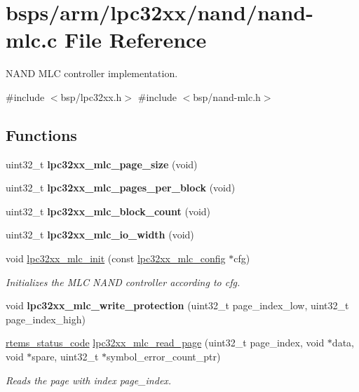 \hypertarget{nand-mlc_8c}{}\section{bsps/arm/lpc32xx/nand/nand-\/mlc.c File Reference}
\label{nand-mlc_8c}


N\+A\+ND M\+LC controller implementation.  


{\ttfamily \#include $<$bsp/lpc32xx.\+h$>$}\newline
{\ttfamily \#include $<$bsp/nand-\/mlc.\+h$>$}\newline
\subsection*{Functions}
\begin{DoxyCompactItemize}
\item 
uint32\+\_\+t {\bfseries lpc32xx\+\_\+mlc\+\_\+page\+\_\+size} (void)
\item 
uint32\+\_\+t {\bfseries lpc32xx\+\_\+mlc\+\_\+pages\+\_\+per\+\_\+block} (void)
\item 
uint32\+\_\+t {\bfseries lpc32xx\+\_\+mlc\+\_\+block\+\_\+count} (void)
\item 
uint32\+\_\+t {\bfseries lpc32xx\+\_\+mlc\+\_\+io\+\_\+width} (void)
\item 
void \mbox{\hyperlink{group__lpc32xx__nand__mlc_ga223b19df7910441502b54c1561f29dcb}{lpc32xx\+\_\+mlc\+\_\+init}} (const \mbox{\hyperlink{structlpc32xx__mlc__config}{lpc32xx\+\_\+mlc\+\_\+config}} $\ast$cfg)
\begin{DoxyCompactList}\small\item\em Initializes the M\+LC N\+A\+ND controller according to {\itshape cfg}. \end{DoxyCompactList}\item 
void {\bfseries lpc32xx\+\_\+mlc\+\_\+write\+\_\+protection} (uint32\+\_\+t page\+\_\+index\+\_\+low, uint32\+\_\+t page\+\_\+index\+\_\+high)
\item 
\mbox{\hyperlink{group__ClassicStatus_ga545d41846817eaba6143d52ee4d9e9fe}{rtems\+\_\+status\+\_\+code}} \mbox{\hyperlink{group__lpc32xx__nand__mlc_gad998b76b7200ed71c4a99422ae2f036c}{lpc32xx\+\_\+mlc\+\_\+read\+\_\+page}} (uint32\+\_\+t page\+\_\+index, void $\ast$data, void $\ast$spare, uint32\+\_\+t $\ast$symbol\+\_\+error\+\_\+count\+\_\+ptr)
\begin{DoxyCompactList}\small\item\em Reads the page with index {\itshape page\+\_\+index}. \end{DoxyCompactList}\item 

\end{DoxyCompactItemize}
